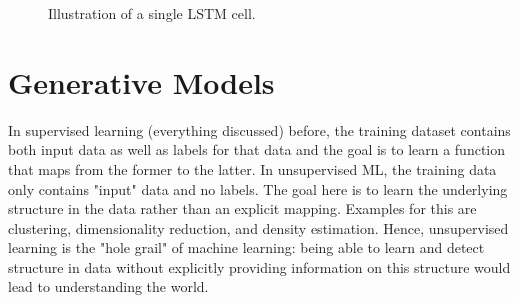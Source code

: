\begin{figure}
			\caption{Illustration of a single LSTM cell.}
			\label{fig:lstmCell}
		\end{figure}

\chapter{Generative Models}
	In supervised learning (everything discussed) before, the training dataset contains both input data as well as labels for that data and the goal is to learn a function that maps from the former to the latter. In unsupervised ML, the training data only contains "input" data and no labels. The goal here is to learn the underlying structure in the data rather than an explicit mapping. Examples for this are clustering, dimensionality reduction, and density estimation. Hence, unsupervised learning is the "hole grail" of machine learning: being able to learn and detect structure in data without explicitly providing information on this structure would lead to understanding the world.

